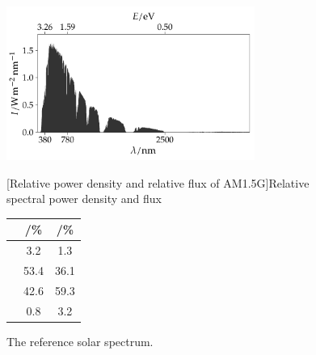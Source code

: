 \documentclass[webedition,openright,titles,swedish,english]{LuaUUThesis}\usepackage[]{graphicx}\usepackage[]{xcolor}
\newenvironment{knitrout}{}{} %
\begin{document}
\begin{figure}[tbp]
\centering
\begin{minipage}[t]{0.68\textwidth}
\strut\vspace*{-\baselineskip}\newline
\centering
\begin{knitrout}\scriptsize
{}\color{fgcolor}

{\centering \includegraphics[width=3.20in]{figure/0100P-fig-solarspectrum-photoec-1} 

}


\end{knitrout}
\caption[The solar spectrum]{The \protect{} reference solar spectrum.}
\label{fig:solarspectrum-photoec}
\end{minipage}%
\hfill%
\begin{minipage}[t]{0.28\textwidth}%
\strut\vspace*{-\baselineskip}\newline
\centering
{}[Relative power density and relative flux of AM1.5G]{Relative spectral power density and flux}
\label{tab:solarspectrum-amounts}
\begin{tabular}{lS[table-format=2.1]S[table-format=2.1]}
  \toprule
{} & {/\unit{\percent}} & {/\unit{\percent}} \\ 
  \midrule
{} & 3.2 & 1.3 \\ 
   & 53.4 & 36.1 \\ 
   & 42.6 & 59.3 \\ 
   & 0.8 & 3.2 \\ 
   \bottomrule
\end{tabular}

\end{minipage}%
\end{figure}
\end{document}
